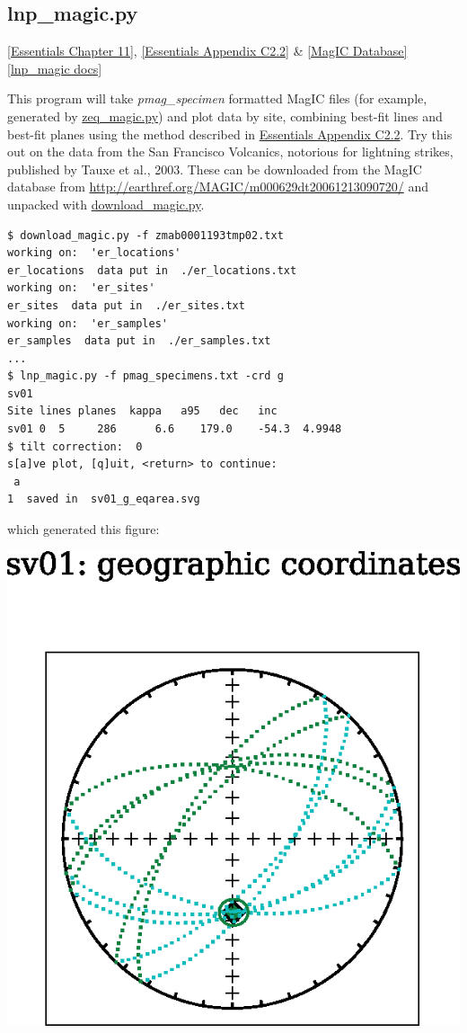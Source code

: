 \documentclass[11pt]{book}
\begin{document}
{{
\subsection{lnp\_magic.py}
\href{http://earthref.org/MAGIC/books/Tauxe/Essentials/WebBook3ch11.html#ch11}{ [Essentials Chapter 11]},  \href{http://earthref.org/MAGIC/books/Tauxe/Essentials/WebBook3ap3.html#linesNplanes}{[Essentials Appendix C2.2]} \& \href{#MagICDatabase}{[MagIC Database]}
\href{https://github.com/PmagPy/PmagPy/blob/master/programs/lnp_magic.py}{[lnp\_magic docs]}

This program will take {\it pmag\_specimen} formatted MagIC files (for example, generated by \href{#zeq_magic.py}{zeq\_magic.py}) and plot data by site, combining best-fit lines and best-fit planes using the method described in  \href{http://earthref.org/MAGIC/books/Tauxe/Essentials/WebBook3ap3.html#linesNplanes}{Essentials Appendix C2.2}.  Try this out on the data from the San Francisco Volcanics, notorious for lightning strikes, published by Tauxe et al., 2003. \nocite{tauxe03b}  These can be downloaded from the MagIC database from \url{http://earthref.org/MAGIC/m000629dt20061213090720/} and unpacked with
\href{#download_magic.py}{download\_magic.py}.


\begin{verbatim}
$ download_magic.py -f zmab0001193tmp02.txt
working on:  'er_locations'
er_locations  data put in  ./er_locations.txt
working on:  'er_sites'
er_sites  data put in  ./er_sites.txt
working on:  'er_samples'
er_samples  data put in  ./er_samples.txt
...
$ lnp_magic.py -f pmag_specimens.txt -crd g
sv01
Site lines planes  kappa   a95   dec   inc
sv01 0  5     286      6.6    179.0    -54.3  4.9948
$ tilt correction:  0
s[a]ve plot, [q]uit, <return> to continue:
 a
1  saved in  sv01_g_eqarea.svg

\end{verbatim}

\noindent which generated this figure:

\includegraphics[width=12 cm]{EPSfiles/lnp-ex.eps}

}}
\end{document}

